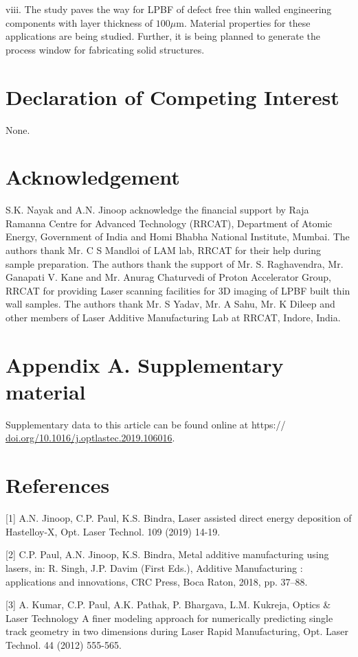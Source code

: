 \documentclass[10pt]{article}
\begin{document}
viii. The study paves the way for LPBF of defect free thin walled engineering components with layer thickness of $100 \mu \mathrm{m}$. Material properties for these applications are being studied. Further, it is being planned to generate the process window for fabricating solid structures.

\section*{Declaration of Competing Interest}
None.

\section*{Acknowledgement}
S.K. Nayak and A.N. Jinoop acknowledge the financial support by Raja Ramanna Centre for Advanced Technology (RRCAT), Department of Atomic Energy, Government of India and Homi Bhabha National Institute, Mumbai. The authors thank Mr. C S Mandloi of LAM lab, RRCAT for their help during sample preparation. The authors thank the support of Mr. S. Raghavendra, Mr. Ganapati V. Kane and Mr. Anurag Chaturvedi of Proton Accelerator Group, RRCAT for providing Laser scanning facilities for 3D imaging of LPBF built thin wall samples. The authors thank Mr. S Yadav, Mr. A Sahu, Mr. K Dileep and other members of Laser Additive Manufacturing Lab at RRCAT, Indore, India.

\section*{Appendix A. Supplementary material}
Supplementary data to this article can be found online at https:// \href{http://doi.org/10.1016/j.optlastec.2019.106016}{doi.org/10.1016/j.optlastec.2019.106016}.

\section*{References}
[1] A.N. Jinoop, C.P. Paul, K.S. Bindra, Laser assisted direct energy deposition of Hastelloy-X, Opt. Laser Technol. 109 (2019) 14-19.

[2] C.P. Paul, A.N. Jinoop, K.S. Bindra, Metal additive manufacturing using lasers, in: R. Singh, J.P. Davim (First Eds.), Additive Manufacturing : applications and innovations, CRC Press, Boca Raton, 2018, pp. 37--88.

[3] A. Kumar, C.P. Paul, A.K. Pathak, P. Bhargava, L.M. Kukreja, Optics \& Laser Technology A finer modeling approach for numerically predicting single track geometry in two dimensions during Laser Rapid Manufacturing, Opt. Laser Technol. 44 (2012) 555-565.
\end{document}
